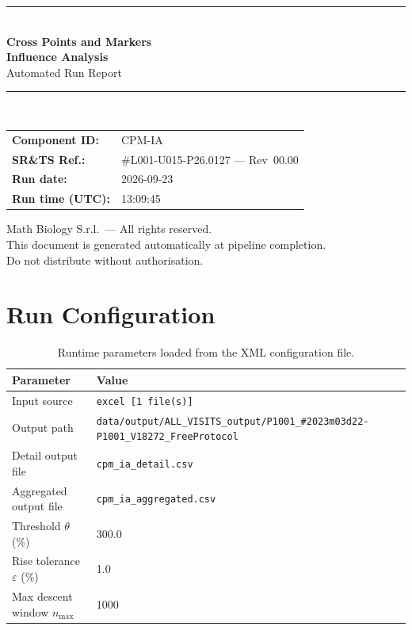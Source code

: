 \documentclass[a4paper,11pt]{article}
\begin{document}
\begin{titlepage}
\begin{center}
  \vspace*{1.8cm}
  {\color{dmaaccent}\rule{\linewidth}{1.5pt}}\\[0.6cm]
  {\LARGE\bfseries\color{dmaaccent}
    Cross Points and Markers\\[0.25cm]
    Influence Analysis}\\[0.4cm]
  {\Large Automated Run Report}\\[0.3cm]
  {\color{dmaaccent}\rule{\linewidth}{1.5pt}}\\[2cm]

  \begin{tabular}{ll}
    \textbf{Component ID:}   & CPM-IA \\[0.3cm]
    \textbf{SR\&TS Ref.:}    & \#L001-U015-P26.0127 --- Rev~00.00 \\[0.3cm]
    \textbf{Run date:}       & 2026-09-23 \\[0.3cm]
    \textbf{Run time (UTC):} & 13:09:45 \\
  \end{tabular}

  \vfill
  {\color{dmagray}\small
    Math Biology S.r.l.\ --- All rights reserved.\\
    This document is generated automatically at pipeline completion.\\
    Do not distribute without authorisation.}
\end{center}
\end{titlepage}

\tableofcontents
\clearpage

\section{Run Configuration}

\begin{table}[h!]
\centering
\small
\caption{Runtime parameters loaded from the XML configuration file.}
\begin{tabular}{ll}
\toprule
\textbf{Parameter} & \textbf{Value} \\
\midrule
Input source                      & \texttt{excel [1 file(s)]} \\
Output path                       & \texttt{data/output/ALL\_VISITS\_output/P1001\_\#2023m03d22-P1001\_V18272\_FreeProtocol} \\
Detail output file                & \texttt{cpm\_ia\_detail.csv} \\
Aggregated output file            & \texttt{cpm\_ia\_aggregated.csv} \\
Threshold $\theta$ (\%)           & 300.0 \\
Rise tolerance $\varepsilon$ (\%) & 1.0 \\
Max descent window $n_{\max}$     & 1000 \\
\bottomrule
\end{tabular}
\end{table}
\end{document}
